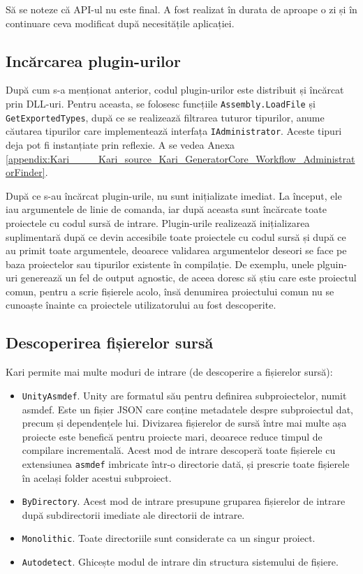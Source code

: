 \documentclass[a4paper,12pt]{report}
\begin{document}
Să se noteze că \ac{API}-ul nu este final.
A fost realizat în durata de aproape o zi și în continuare ceva modificat după necesitățile aplicației.


\subsection{Incărcarea plugin-urilor}

După cum s-a menționat anterior, codul plugin-urilor este distribuit și încărcat prin \ac{DLL}-uri.
Pentru aceasta, se folosesc funcțiile \texttt{Assembly.LoadFile} și \texttt{GetExportedTypes}, după ce se realizează filtrarea tuturor tipurilor, anume căutarea tipurilor care implementează interfața \texttt{IAdministrator}.
Aceste tipuri deja pot fi instanțiate prin reflexie.
A se vedea Anexa \ref{appendix:Kari____Kari_source_Kari_GeneratorCore_Workflow_AdministratorFinder}.

După ce s-au încărcat plugin-urile, nu sunt inițializate imediat.
La început, ele iau argumentele de linie de comanda, iar după aceasta sunt încărcate toate proiectele cu codul sursă de intrare.
Plugin-urile realizează inițializarea suplimentară după ce devin accesibile toate proiectele cu codul sursă și după ce au primit toate argumentele, deoarece validarea argumentelor deseori se face pe baza proiectelor sau tipurilor existente în compilație.
De exemplu, unele plguin-uri generează un fel de output agnostic, de aceea doresc să știu care este proiectul comun, pentru a scrie fișierele acolo, însă denumirea proiectului comun nu se cunoaște înainte ca proiectele utilizatorului au fost descoperite.

\subsection{Descoperirea fișierelor sursă}

Kari permite mai multe moduri de intrare (de descoperire a fișierelor sursă):

\begin{itemize}
  \item \texttt{UnityAsmdef}.
    Unity are formatul său pentru definirea subproiectelor, numit asmdef.
    Este un fișier JSON care conține metadatele despre subproiectul dat, precum și dependențele lui.
    Divizarea fișierelor de sursă între mai multe așa proiecte este benefică pentru proiecte mari, deoarece reduce timpul de compilare incrementală.
    Acest mod de intrare descoperă toate fișierele cu extensiunea \texttt{asmdef} imbricate într-o directorie dată, și prescrie toate fișierele în același folder acestui subproiect.

  \item \texttt{ByDirectory}. Acest mod de intrare presupune gruparea fișierelor de intrare după subdirectorii imediate ale directorii de intrare.

  \item \texttt{Monolithic}. Toate directoriile sunt considerate ca un singur proiect.

  \item \texttt{Autodetect}. Ghicește modul de intrare din structura sistemului de fișiere.
\end{itemize}
\end{document}
